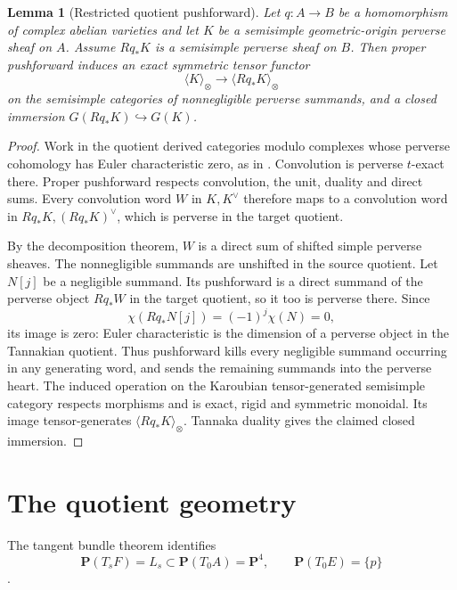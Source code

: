\documentclass[10pt]{amsart}
\numberwithin{equation}{section}
\newtheorem{lemma}[theorem]{Lemma}
\theoremstyle{remark}
\newcommand{\PP}{\mathbf P}
\begin{document}
\begin{lemma}[Restricted quotient pushforward]\label{lem:restricted-quotient-tensor}
Let $q:A\to B$ be a homomorphism of complex abelian varieties and let
$K$ be a semisimple geometric-origin perverse sheaf on $A$.
Assume $Rq_*K$ is a semisimple perverse sheaf on $B$.
Then proper pushforward induces an exact symmetric tensor functor
\[
 \langle K\rangle_\otimes\longrightarrow
 \langle Rq_*K\rangle_\otimes
\]
on the semisimple categories of nonnegligible perverse summands,
and a closed immersion $G(Rq_*K)\hookrightarrow G(K)$.
\end{lemma}
\begin{proof}
Work in the quotient derived categories modulo complexes whose
perverse cohomology has Euler characteristic zero, as in
\cite[Proposition~3.1]{JKLM2025}. Convolution is perverse
$t$-exact there. Proper pushforward respects convolution, the unit,
duality and direct sums. Every convolution word $W$ in $K,K^\vee$
therefore maps to a convolution word in $Rq_*K,(Rq_*K)^\vee$,
which is perverse in the target quotient.

By the decomposition theorem, $W$ is a direct sum of shifted simple
perverse sheaves. The nonnegligible summands are unshifted in the
source quotient. Let $N[j]$ be a negligible summand.
Its pushforward is a direct summand of the perverse object $Rq_*W$
in the target quotient, so it too is perverse there. Since
\[
  \chi(Rq_*N[j])=(-1)^j\chi(N)=0,
\]
its image is zero: Euler characteristic is the dimension of a
perverse object in the Tannakian quotient. Thus pushforward kills
every negligible summand occurring in any generating word, and sends
the remaining summands into the perverse heart. The induced
operation on the Karoubian tensor-generated semisimple category
respects morphisms and is exact, rigid and symmetric monoidal.
Its image tensor-generates $\langle Rq_*K\rangle_\otimes$.
Tannaka duality gives the claimed closed immersion.
\end{proof}

\section{The quotient geometry}

The tangent bundle theorem identifies
\begin{equation}\label{eq:tangent}
 \PP(T_sF)=L_s\subset\PP(T_0A)=\PP^4,
 \qquad \PP(T_0E)=\{p\}
\end{equation}
\cite{CG1972}\cite[Proposition~4]{Roulleau2009}.
\end{document}
